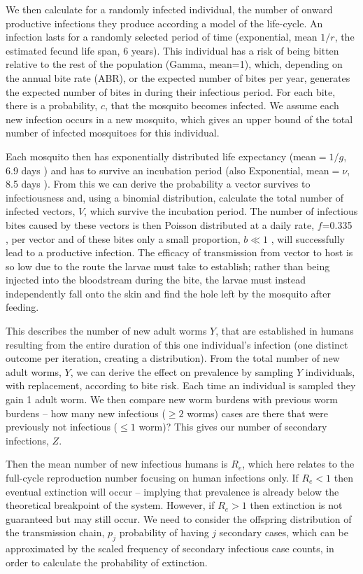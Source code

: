 We then calculate for a randomly infected individual, the number of onward productive infections they produce according a model of the life-cycle. An infection lasts for a randomly selected period of time (exponential, mean $1/r$, the estimated fecund life span, 6 years). This individual has a risk of being bitten relative to the rest of the population (Gamma, mean=1), which, depending on the annual bite rate (ABR), or the expected number of bites per year, generates the expected number of bites in during their infectious period. For each bite, there is a probability, $c$, that the mosquito becomes infected. We assume each new infection occurs in a new mosquito, which gives an upper bound of the total number of infected mosquitoes for this individual.

Each mosquito then has exponentially distributed life expectancy (mean$=1/g$, 6.9 days \cite{Killeen2000,Subramanian1998}) and has to survive an incubation period (also Exponential, mean$=\nu$, 8.5 days \cite{erickson2009}). From this we can derive the probability a vector survives to infectiousness and, using a binomial distribution, calculate the total number of infected vectors, $V$, which survive the incubation period. The number of infectious bites caused by these vectors is then Poisson distributed at a daily rate, $f$=0.335 \cite{Subramanian1998}, per vector and of these bites only a small proportion, $b\ll1$ \cite{Hairston1968,Jones2014}, will successfully lead to a productive infection. The efficacy of transmission from vector to host is so low due to the route the larvae must take to establish; rather than being injected into the bloodstream during the bite, the larvae must instead independently fall onto the skin and find the hole left by the mosquito after feeding.

This describes the number of new adult worms $Y$, that are established in humans resulting from the entire duration of this one individual's infection (one distinct outcome per iteration, creating a distribution). From the total number of new adult worms, $Y$, we can derive the effect on prevalence by sampling $Y$ individuals, with replacement, according to bite risk. Each time an individual is sampled they gain 1 adult worm. We then compare new worm burdens with previous worm burdens -- how many new infectious ($\geq 2$ worms) cases are there that were previously not infectious ($\leq 1$ worm)? This gives our number of secondary infections, $Z$.

Then the mean number of new infectious humans is $R_e$, which here relates to the full-cycle reproduction number focusing on human infections only. If $R_e<1$ then eventual extinction will occur -- implying that prevalence is already below the theoretical breakpoint of the system. However, if $R_e>1$ then extinction is not guaranteed but may still occur. We need to consider the offspring distribution of the transmission chain, $p_j$ probability of having $j$ secondary cases, which can be approximated by the scaled frequency of secondary infectious case counts, in order to calculate the probability of extinction.

